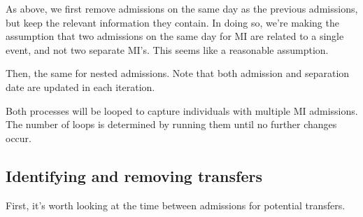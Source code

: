 \documentclass[11pt]{article}
\begin{document}
As above, we first remove admissions on the same day as the previous admissions, 
but keep the relevant information they contain. In doing so, we're making the assumption
that two admissions on the same day for MI are related to a single event,
and not two separate MI's. This seems like a reasonable assumption. 

Then, the same for nested admissions. Note that both admission and separation date
are updated in each iteration. 

Both processes will be looped to capture individuals with multiple MI admissions. 
The number of loops is determined by running them until no further changes occur. 

\color{Blue4}
\begin{stlog}\end{stlog}
\color{black}

\clearpage
\subsection{Identifying and removing transfers}

First, it's worth looking at the time between admissions
for potential transfers. 
\end{document}
